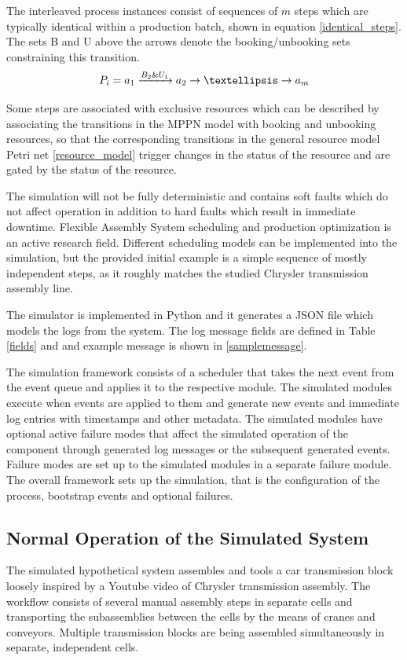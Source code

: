 \documentclass[journal]{IEEEtran}
\begin{document}
The interleaved process instances consist of sequences of $ m $ steps which are typically identical within a production batch, shown in equation \ref{identical_steps}.
The sets B and U above the arrows denote the booking/unbooking sets constraining this transition.
\begin{equation}
 P_i = a_1 \xrightarrow{B_2 \& U_1} a_2 \rightarrow \textellipsis \rightarrow a_m
 \label{identical_steps}
\end{equation}

Some steps are associated with exclusive resources which can be described by associating the transitions in the MPPN model with booking and unbooking resources, so that
the corresponding transitions in the general resource model Petri net \ref{resource_model} trigger changes in the status of the resource and
are gated by the status of the resource.

The simulation will not be fully deterministic and contains soft faults which do not affect operation in addition to hard faults which result in immediate downtime.
Flexible Assembly System scheduling and production optimization is an active research field. Different scheduling models can be implemented into the simulation,
but the provided initial example is a simple sequence of mostly independent steps, as it roughly matches the studied Chrysler transmission assembly line.

The simulator is implemented in Python and it generates a JSON file which models the logs from the system. The log message fields are defined in Table \ref{fields} and
and example message is shown in \ref{samplemessage}.

The simulation framework consists of a scheduler that takes the next event from the event queue and applies it to the respective module. The simulated modules
execute when events are applied to them and generate new events and immediate log entries with timestamps and other metadata.
The simulated modules have optional active failure modes that affect the simulated operation of the component through
generated log messages or the subsequent generated events. Failure modes are set up to the simulated modules in a separate failure module.
The overall framework sets up the simulation, that is the configuration of the process, bootstrap events and optional failures.

\subsection{Normal Operation of the Simulated System}
The simulated hypothetical system assembles and tools a car transmission block loosely inspired by a Youtube video of Chrysler transmission assembly\cite{transmission}.
The workflow consists of several manual assembly steps in separate cells and transporting the subassemblies between the cells by the means of
cranes and conveyors. Multiple transmission blocks are being assembled simultaneously in separate, independent cells.
\end{document}
